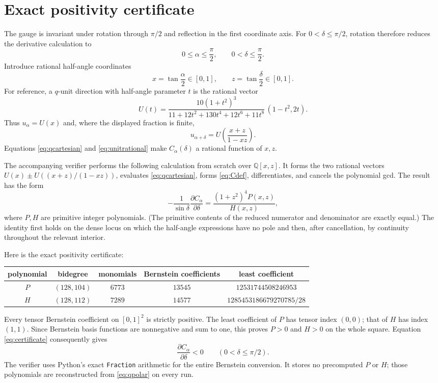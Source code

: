 \documentclass[11pt]{article}
\begin{document}
\section{Exact positivity certificate}

The gauge is invariant under rotation through $\pi/2$ and reflection in the
first coordinate axis.  For $0<\delta\le\pi/2$, rotation therefore reduces
the derivative calculation to
\[
 0\le\alpha\le\frac\pi2,\qquad
 0<\delta\le\frac\pi2.
\]
Introduce rational half-angle coordinates
\[
 x=\tan\frac\alpha2\in[0,1],\qquad
 z=\tan\frac\delta2\in[0,1].
\]
For reference, a $q$-unit direction with half-angle parameter $t$ is the
rational vector
\begin{equation}\label{eq:unitrational}
 U(t)=\frac{10(1+t^2)^3}
 {11+12t^2+130t^4+12t^6+11t^8}\,(1-t^2,2t).
\end{equation}
Thus $u_\alpha=U(x)$ and, where the displayed fraction is finite,
\[
 u_{\alpha+\delta}=U\!\left(\frac{x+z}{1-xz}\right).
\]
Equations \eqref{eq:qcartesian} and \eqref{eq:unitrational} make
$C_\alpha(\delta)$ a rational function of $x,z$.

The accompanying verifier performs the following calculation from scratch
over $\mathbb Q[x,z]$.  It forms the two rational vectors $U(x)\pm
U((x+z)/(1-xz))$, evaluates \eqref{eq:qcartesian}, forms
\eqref{eq:Cdef}, differentiates, and cancels the polynomial gcd.  The result
has the form
\begin{equation}\label{eq:certificate}
 -\frac{1}{\sin\delta}\frac{\partial C_\alpha}{\partial\delta}
 =\frac{(1+z^2)^4P(x,z)}{H(x,z)},
\end{equation}
where $P,H$ are primitive integer polynomials.  (The primitive contents of
the reduced numerator and denominator are exactly equal.)  The identity first holds on
the dense locus on which the half-angle expressions have no pole and then,
after cancellation, by continuity throughout the relevant interior.

Here is the exact positivity certificate:
\begin{center}
\begin{tabular}{c|c|c|c|c}
 polynomial & bidegree & monomials & Bernstein coefficients & least coefficient\\ \hline
 $P$ & $(128,104)$ & $6773$ & $13545$ & $12531744508246953$\\
 $H$ & $(128,112)$ & $7289$ & $14577$ & $1285453186679270785/28$
\end{tabular}
\end{center}
Every tensor Bernstein coefficient on $[0,1]^2$ is strictly positive.  The
least coefficient of $P$ has tensor index $(0,0)$; that of $H$ has index
$(1,1)$.  Since Bernstein basis functions are nonnegative and sum to one,
this proves $P>0$ and $H>0$ on the whole square.  Equation
\eqref{eq:certificate} consequently gives
\begin{equation}\label{eq:firsthalf}
 \frac{\partial C_\alpha}{\partial\delta}<0
 \qquad(0<\delta\le\pi/2).
\end{equation}
The verifier uses Python's exact \texttt{Fraction} arithmetic for the entire
Bernstein conversion.  It stores no precomputed $P$ or $H$; those
polynomials are reconstructed from \eqref{eq:qpolar} on every run.
\end{document}
